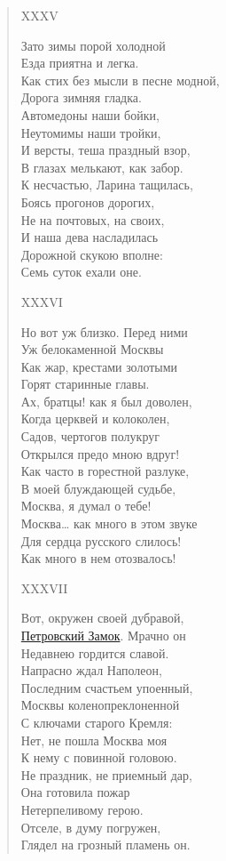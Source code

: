 \begin{verse}
XXXV

Зато зимы порой холодной\\
Езда приятна и легка.\\
Как стих без мысли в песне модной,\\
Дорога зимняя гладка.\\
Автомедоны наши бойки,\\
Неутомимы наши тройки,\\
И версты, теша праздный взор,\\
В глазах мелькают, как забор.\\
К несчастью, Ларина тащилась,\\
Боясь прогонов дорогих,\\
Не на почтовых, на своих,\\
И наша дева насладилась\\
Дорожной скукою вполне:\\
Семь суток ехали оне.

XXXVI

Но вот уж близко. Перед ними\\
Уж белокаменной Москвы\\
Как жар, крестами золотыми\\
Горят старинные главы.\\
Ах, братцы! как я был доволен,\\
Когда церквей и колоколен,\\
Садов, чертогов полукруг\\
Открылся предо мною вдруг!\\
Как часто в горестной разлуке,\\
В моей блуждающей судьбе,\\
Москва, я думал о тебе!\\
Москва… как много в этом звуке\\
Для сердца русского слилось!\\
Как много в нем отозвалось!

XXXVII

Вот, окружен своей дубравой,\\
\hyperref[ch:дд]{Петровский Замок}. Мрачно он\\
Недавнею гордится славой.\\
Напрасно ждал Наполеон,\\
Последним счастьем упоенный,\\
Москвы коленопреклоненной\\
С ключами старого Кремля:\\
Нет, не пошла Москва моя\\
К нему с повинной головою.\\
Не праздник, не приемный дар,\\
Она готовила пожар\\
Нетерпеливому герою.\\
Отселе, в думу погружен,\\
Глядел на грозный пламень он.


\end{verse}
